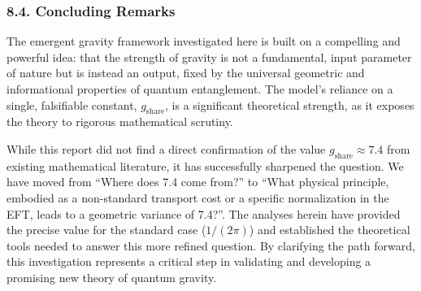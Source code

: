 \documentclass[11pt]{article}
\begin{document}
\subsubsection*{8.4. Concluding Remarks}
The emergent gravity framework investigated here is built on a compelling and powerful idea: that the strength of gravity is not a fundamental, input parameter of nature but is instead an output, fixed by the universal geometric and informational properties of quantum entanglement. The model’s reliance on a single, falsifiable constant, $g_{\mathrm{share}}$, is a significant theoretical strength, as it exposes the theory to rigorous mathematical scrutiny.

While this report did not find a direct confirmation of the value $g_{\mathrm{share}} \approx 7.4$ from existing mathematical literature, it has successfully sharpened the question. We have moved from “Where does 7.4 come from?” to “What physical principle, embodied as a non-standard transport cost or a specific normalization in the EFT, leads to a geometric variance of 7.4?”. The analyses herein have provided the precise value for the standard case ($1/(2\pi)$) and established the theoretical tools needed to answer this more refined question. By clarifying the path forward, this investigation represents a critical step in validating and developing a promising new theory of quantum gravity.
\end{document}

